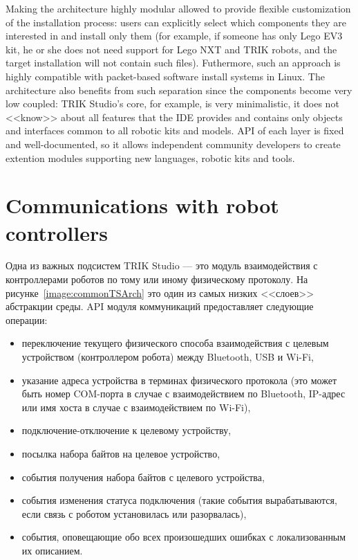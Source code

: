 \documentclass[conference]{IEEEtran}
\begin{document}
Making the architecture highly modular allowed to provide flexible customization of the installation process: users can explicitly select which components they are interested in and install only them (for example, if someone has only Lego EV3 kit, he or she does not need support for Lego NXT and TRIK robots, and the target installation will not contain such files). Futhermore, such an approach is highly compatible with packet-based software install systems in Linux. The architecture also benefits from such separation since the components become very low coupled: TRIK Studio's core, for example, is very minimalistic, it does not <<know>> about all features that the IDE provides and contains only objects and interfaces common to all robotic kits and models. API of each layer is fixed and well-documented, so it allows independent community developers to create extention modules supporting new languages, robotic kits and tools.

\section{Communications with robot controllers}
\label{chapter:communications}

Одна из важных подсистем TRIK Studio --- это модуль взаимодействия с контроллерами роботов по тому или иному физическому протоколу. На рисунке~\ref{image:commonTSArch} это один из самых низких <<слоев>> абстракции среды. API модуля коммуникаций предоставляет следующие операции:

\begin{itemize}
    \item переключение текущего физического способа взаимодействия с целевым устройством (контроллером робота) между Bluetooth, USB и Wi-Fi,
    \item указание адреса устройства в терминах физического протокола (это может быть номер COM-порта в случае с взаимодействием по Bluetooth, IP-адрес или имя хоста в случае с взаимодействием по Wi-Fi),
    \item подключение-отключение к целевому устройству,
    \item посылка набора байтов на целевое устройство,
    \item события получения набора байтов с целевого устройства,
    \item события изменения статуса подключения (такие события вырабатываются, если связь с роботом установилась или разорвалась),
    \item события, оповещающие обо всех произошедших ошибках с локализованным их описанием.
\end{itemize}
\end{document}
